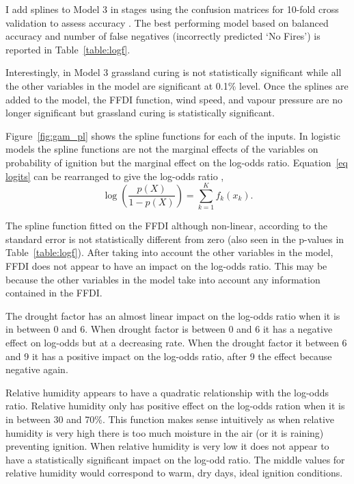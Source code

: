 \documentclass[11pt,a4paper]{article}
\begin{document}
I add splines to Model 3 in stages using the confusion matrices for 10-fold cross validation to assess accuracy \citep[][using the caret package by]{caret}. The best performing model based on balanced accuracy and number of false negatives (incorrectly predicted `No Fires') is reported in Table~\ref{table:logf}.

Interestingly, in Model 3 grassland curing is not statistically significant while all the other variables in the model are significant at 0.1\% level. Once the splines are added to the model, the FFDI function, wind speed, and vapour pressure are no longer significant but grassland curing is statistically significant.

Figure~\ref{fig:gam_pl} shows the spline functions for each of the inputs. In logistic models the spline functions are not the marginal effects of the variables on probability of ignition but the marginal effect on the log-odds ratio. Equation~\eqref{eq logits} can be rearranged to give the log-odds ratio \citep{james13},
\begin{equation}
  \label{eq:logodds}
  \log(\frac{p(X)}{1-p(X)}) = \sum_{k=1}^{K} f_k (x_k).
\end{equation}

The spline function fitted on the FFDI although non-linear, according to the standard error is not statistically different from zero (also seen in the p-values in Table~\ref{table:logf}). After taking into account the other variables in the model, FFDI does not appear to have an impact on the log-odds ratio. This may be because the other variables in the model take into account any information contained in the FFDI.

The drought factor has an almost linear impact on the log-odds ratio when it is in between 0 and 6. When drought factor is between 0 and 6 it has a negative effect on log-odds but at a decreasing rate. When the drought factor it between 6 and 9 it has a positive impact on the log-odds ratio, after 9 the effect because negative again.

Relative humidity appears to have a quadratic relationship with the log-odds ratio. Relative humidity only has positive effect on the log-odds ration when it is in between 30 and 70\%. This function makes sense intuitively as when relative humidity is very high there is too much moisture in the air (or it is raining) preventing ignition. When relative humidity is very low it does not appear to have a statistically significant impact on the log-odd ratio. The middle values for relative humidity would correspond to warm, dry days, ideal ignition conditions.
\end{document}
